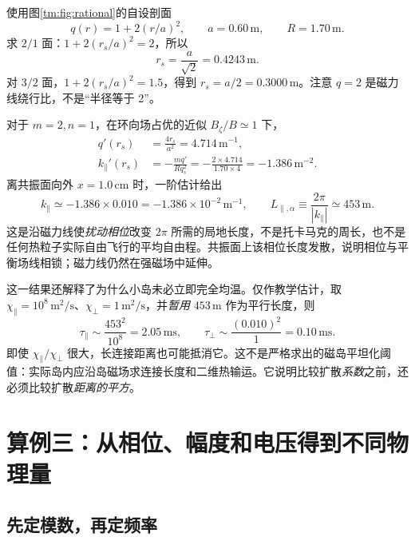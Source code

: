 使用图\ref{tm:fig:rational}的自设剖面
\begin{equation}
 q(r)=1+2(r/a)^2,\qquad a=0.60\,\mathrm m,\qquad R=1.70\,\mathrm m.
\end{equation}
求 $2/1$ 面：$1+2(r_s/a)^2=2$，所以
\begin{equation}
 r_s=\frac{a}{\sqrt2}=0.4243\,\mathrm m.
\end{equation}
对 $3/2$ 面，$1+2(r_s/a)^2=1.5$，得到 $r_s=a/2=0.3000\,\mathrm m$。注意 $q=2$ 是磁力线绕行比，不是“半径等于 2”。

对于 $m=2,n=1$，在环向场占优的近似 $B_\zeta/B\simeq1$ 下，
\begin{align}
 q'(r_s)&=\frac{4r_s}{a^2}=4.714\,\mathrm{m^{-1}},\\
 k_\parallel'(r_s)&=-\frac{m q'}{R q_s^2}
 =-\frac{2\times4.714}{1.70\times4}
 =-1.386\,\mathrm{m^{-2}}.
\end{align}
离共振面向外 $x=1.0\,\mathrm{cm}$ 时，一阶估计给出
\begin{equation}
 k_\parallel\simeq-1.386\times0.010
 =-1.386\times10^{-2}\,\mathrm{m^{-1}},
 \qquad L_{\parallel,\alpha}\equiv\frac{2\pi}{|k_\parallel|}\simeq453\,\mathrm m.
\end{equation}
这是沿磁力线使\emph{扰动相位}改变 $2\pi$ 所需的局地长度，不是托卡马克的周长，也不是任何热粒子实际自由飞行的平均自由程。共振面上该相位长度发散，说明相位与平衡场线相锁；磁力线仍然在强磁场中延伸。

这一结果还解释了为什么小岛未必立即完全均温。仅作教学估计，取 $\chi_\parallel=10^8\,\mathrm{m^2/s}$、$\chi_\perp=1\,\mathrm{m^2/s}$，并\emph{暂用} $453\,\mathrm m$ 作为平行长度，则
\begin{equation}
 \tau_\parallel\sim\frac{453^2}{10^8}=2.05\,\mathrm{ms},
 \qquad
 \tau_\perp\sim\frac{(0.010)^2}{1}=0.10\,\mathrm{ms}.
\end{equation}
即使 $\chi_\parallel/\chi_\perp$ 很大，长连接距离也可能抵消它。这不是严格求出的磁岛平坦化阈值：实际岛内应沿岛磁场求连接长度和二维热输运。它说明比较扩散\emph{系数}之前，还必须比较扩散\emph{距离的平方}。

\section{算例三：从相位、幅度和电压得到不同物理量}

\subsection{先定模数，再定频率}

